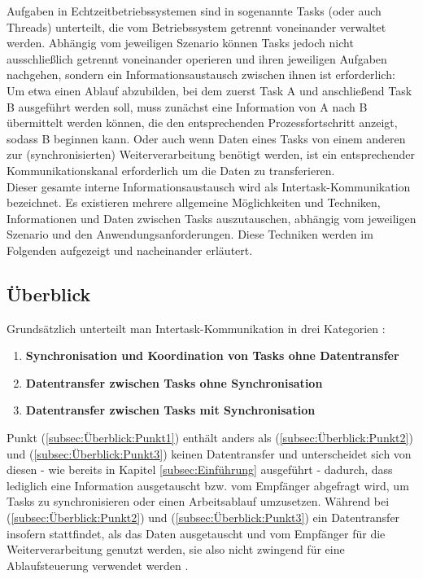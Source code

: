 \documentclass{llncs}
\begin{document}
Aufgaben in Echtzeitbetriebssystemen sind in sogenannte Tasks (oder auch Threads) unterteilt, die vom Betriebssystem getrennt voneinander verwaltet werden. Abhängig vom jeweiligen Szenario können Tasks jedoch nicht ausschließlich getrennt voneinander operieren und ihren jeweiligen Aufgaben nachgehen, sondern ein Informationsaustausch zwischen ihnen ist erforderlich: Um etwa einen Ablauf abzubilden, bei dem zuerst Task A und anschließend Task B ausgeführt werden soll, muss zunächst eine Information von A nach B übermittelt werden können, die den entsprechenden Prozessfortschritt anzeigt, sodass B beginnen kann. Oder auch wenn Daten eines Tasks von einem anderen zur (synchronisierten) Weiterverarbeitung benötigt werden, ist ein entsprechender Kommunikationskanal erforderlich um die Daten zu transferieren.\\

Dieser gesamte interne Informationsaustausch wird als Intertask-Kommunikation bezeichnet. Es existieren mehrere allgemeine Möglichkeiten und Techniken, Informationen und Daten zwischen Tasks auszutauschen, abhängig vom jeweiligen Szenario und den Anwendungsanforderungen. Diese Techniken werden im Folgenden aufgezeigt und nacheinander erläutert.

\subsection{Überblick}
\label{subsec:Überblick}
Grundsätzlich unterteilt man Intertask-Kommunikation in drei Kategorien \autocite[vgl.][79]{Cooling2017}:
\begin{enumerate}
	\setlength\itemsep{0.5em} %
	\item \textbf{Synchronisation und Koordination von Tasks ohne Datentransfer} \label{subsec:Überblick:Punkt1}
	\item \textbf{Datentransfer zwischen Tasks ohne Synchronisation} \label{subsec:Überblick:Punkt2}
	\item \textbf{Datentransfer zwischen Tasks mit Synchronisation} \label{subsec:Überblick:Punkt3}
\end{enumerate}
Punkt (\ref{subsec:Überblick:Punkt1}) enthält anders als (\ref{subsec:Überblick:Punkt2}) und (\ref{subsec:Überblick:Punkt3}) keinen Datentransfer und unterscheidet sich von diesen - wie bereits in Kapitel \ref{subsec:Einführung} ausgeführt - dadurch, dass lediglich eine Information ausgetauscht bzw. vom Empfänger abgefragt wird, um Tasks zu synchronisieren oder einen Arbeitsablauf umzusetzen. Während bei (\ref{subsec:Überblick:Punkt2}) und (\ref{subsec:Überblick:Punkt3}) ein Datentransfer insofern stattfindet, als das Daten ausgetauscht und vom Empfänger für die Weiterverarbeitung genutzt werden, sie also nicht zwingend für eine Ablaufsteuerung verwendet werden \autocite[vgl.][80]{Cooling2017}.
\end{document}
